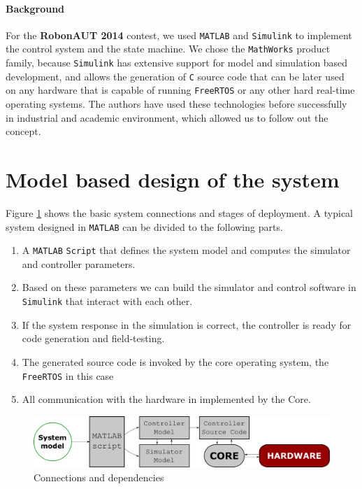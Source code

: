 \paragraph{Background}

For the \textbf{RobonAUT 2014} contest, we used \verb!MATLAB! and \verb!Simulink! to implement the control system and the state machine. We chose the \verb!MathWorks! product family, because \verb!Simulink! has extensive support for model and simulation based development, and allows the generation of \verb!C! source code that can be later used on any hardware that is capable of running \verb!FreeRTOS! or any other hard real-time operating systems. The authors have used these technologies before successfully in industrial and academic environment, which allowed us to follow out the concept.

\section{Model based design of the system}


Figure \ref{fig:architecture} shows the basic system connections and stages of deployment. A typical system designed in \verb!MATLAB! can be divided to the following parts.

\begin{enumerate}
\item A \verb!MATLAB! \verb!Script! that defines the system model and computes the simulator and controller parameters.
\item Based on these parameters we can build the simulator and control software in \verb!Simulink! that interact with each other.
\item If the system response in the simulation is correct, the controller is ready for code generation and field-testing.
\item The generated source code is invoked by the core operating system, the \verb!FreeRTOS! in this case
\item All communication with the hardware in implemented by the Core.
\end{enumerate}

\begin{figure}[!ht]
    \centering
    \includegraphics[width=0.7\linewidth]{img/architecture}
    \caption{Connections and dependencies}
    \label{fig:architecture}
\end{figure}

